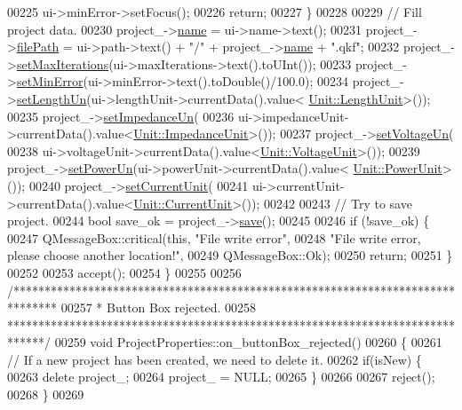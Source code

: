\begin{DoxyCode}
00225     ui->minError->setFocus();
00226     \textcolor{keywordflow}{return};
00227   \}
00228 
00229   \textcolor{comment}{// Fill project data.}
00230   project\_->\hyperlink{class_project_a82dd2d1bc38f9fd08c9a811fcaa76b38}{name} = ui->name->text();
00231   project\_->\hyperlink{class_project_a79f30adcefd0b72bd4ac7db724bc9531}{filePath} = ui->path->text() + \textcolor{stringliteral}{"/"} + project\_->\hyperlink{class_project_a82dd2d1bc38f9fd08c9a811fcaa76b38}{name} + \textcolor{stringliteral}{".qkf"};
00232   project\_->\hyperlink{class_project_af2046a5d542d3e3dd51cb9cb04604e8f}{setMaxIterations}(ui->maxIterations->text().toUInt());
00233   project\_->\hyperlink{class_project_a2cb776c39adb42a1113bf7887d0d4636}{setMinError}(ui->minError->text().toDouble()/100.0);
00234   project\_->\hyperlink{class_project_a846ee2284b0856d461b35d78d9f8e1d6}{setLengthUn}(ui->lengthUnit->currentData().value<
      \hyperlink{class_unit_a8c8921f7b225ad6063b1cb573425b9a0}{Unit::LengthUnit}>());
00235   project\_->\hyperlink{class_project_a995d050781923522ae2a02728346d199}{setImpedanceUn}(
00236     ui->impedanceUnit->currentData().value<\hyperlink{class_unit_a3747e779c805df24a71961290be3fbdf}{Unit::ImpedanceUnit}>());
00237   project\_->\hyperlink{class_project_aa26b488b2e93c8a8c6b4423ce07df4a1}{setVoltageUn}(
00238     ui->voltageUnit->currentData().value<\hyperlink{class_unit_a55b07dfa9457e1eca2c7194fe0cfc3c1}{Unit::VoltageUnit}>());
00239   project\_->\hyperlink{class_project_aa46b8645d2047c1a2e8d329b9ebbc120}{setPowerUn}(ui->powerUnit->currentData().value<
      \hyperlink{class_unit_ace265ae255370ccacfd5370337572c3b}{Unit::PowerUnit}>());
00240   project\_->\hyperlink{class_project_a64d9800bc3acafcfa4d3f45ee5aacc6d}{setCurrentUnit}(
00241     ui->currentUnit->currentData().value<\hyperlink{class_unit_a0794cf6c9682f48296dd4a5315389787}{Unit::CurrentUnit}>());
00242 
00243   \textcolor{comment}{// Try to save project.}
00244   \textcolor{keywordtype}{bool} save\_ok = project\_->\hyperlink{class_project_a596a875bc5be73bc5b1b71b6448c1e07}{save}();
00245 
00246   \textcolor{keywordflow}{if} (!save\_ok) \{
00247     QMessageBox::critical(\textcolor{keyword}{this}, \textcolor{stringliteral}{"File write error"},
00248                           \textcolor{stringliteral}{"File write error, please choose another location!"},
00249                           QMessageBox::Ok);
00250     \textcolor{keywordflow}{return};
00251   \}
00252 
00253   accept();
00254 \}
00255 
00256 \textcolor{comment}{/*******************************************************************************}
00257 \textcolor{comment}{ * Button Box rejected.}
00258 \textcolor{comment}{ ******************************************************************************/}
00259 \textcolor{keywordtype}{void} ProjectProperties::on\_buttonBox\_rejected()
00260 \{
00261   \textcolor{comment}{// If a new project has been created, we need to delete it.}
00262   \textcolor{keywordflow}{if}(isNew) \{
00263     \textcolor{keyword}{delete} project\_;
00264     project\_ = NULL;
00265   \}
00266 
00267   reject();
00268 \}
00269 
\end{DoxyCode}
